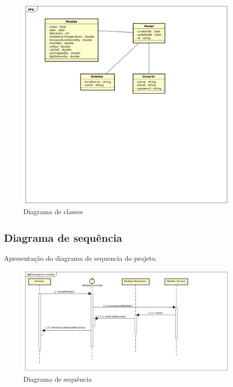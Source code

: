 \begin{figure}[H]
    \label{figure_diagrama_classe}
    \centering
    \caption{Diagrama de classes}
    \includegraphics[scale=0.5]{diagrams/classe.png}
    \hfill
\end{figure}

\subsection{Diagrama de sequência}

Apresentação do diagrama de sequencia do projeto.

\begin{figure}[H]
    \label{figure_diagrama_sequencia}
    \centering
    \caption{Diagrama de sequência}
    \includegraphics[scale=0.40]{diagrams/sequencia.png}
    \hfill
\end{figure}

